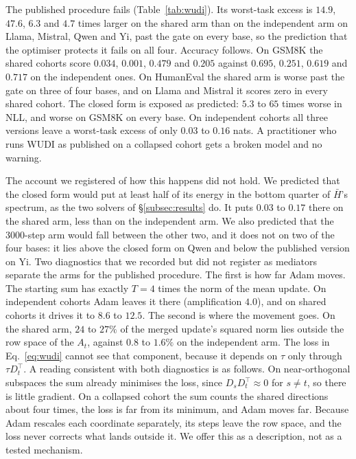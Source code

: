 The published procedure fails (Table~\ref{tab:wudi}). Its worst-task excess is
$14.9$, $47.6$, $6.3$ and $4.7$ times larger on the shared arm than on the
independent arm on Llama, Mistral, Qwen and Yi, past the gate on every base,
so the prediction that the optimiser protects it fails on all four. Accuracy
follows. On GSM8K the shared cohorts score $0.034$, $0.001$, $0.479$ and
$0.205$ against $0.695$, $0.251$, $0.619$ and $0.717$ on the independent ones.
On HumanEval the shared arm is worse past the gate on three of four bases, and
on Llama and Mistral it scores zero in every shared cohort. The closed form is
exposed as predicted: $5.3$ to $65$ times worse in NLL, and worse on GSM8K on
every base. On independent cohorts all three versions leave a worst-task
excess of only $0.03$ to $0.16$ nats.
A practitioner who runs WUDI as published on a collapsed cohort gets a broken
model and no warning.

The account we registered of how this happens did not hold. We predicted that
the closed form would put at least half of its energy in the bottom quarter of
$\bar H$'s spectrum, as the two solvers of \S\ref{subsec:results} do. It puts
$0.03$ to $0.17$ there on the shared arm, less than on the independent arm. We
also predicted that the 3000-step arm would fall between the other two, and it
does not on two of the four bases: it lies above the closed form on Qwen and
below the published version on Yi. Two diagnostics that we recorded but did not
register as mediators separate the arms for the published procedure. The
first is how far Adam moves. The starting sum has exactly $T = 4$ times the
norm of the mean update. On independent cohorts Adam leaves it there
(amplification $4.0$), and on shared cohorts it drives it to $8.6$ to $12.5$.
The second is where the movement goes. On the shared arm, $24$ to $27\%$ of
the merged update's squared norm lies outside the row space of the $A_t$,
against $0.8$ to $1.6\%$ on the independent arm. The loss in
Eq.~\eqref{eq:wudi} cannot see that component, because it depends on $\tau$
only through $\tau D_t^\top$. A reading consistent with both diagnostics is
as follows. On near-orthogonal subspaces the sum already minimises the loss,
since $D_sD_t^\top \approx 0$ for $s \neq t$, so there is little gradient. On a
collapsed cohort the sum counts the shared directions about four times, the
loss is far from its minimum, and Adam moves far. Because Adam rescales each
coordinate separately, its steps leave the row space, and the loss never
corrects what lands outside it. We offer this as a description, not as a
tested mechanism.

